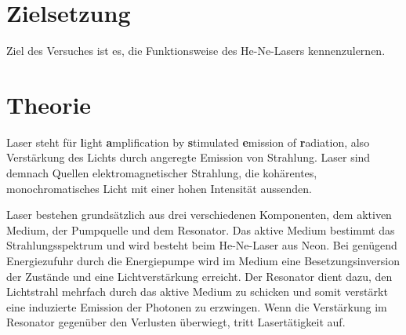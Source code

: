 \section{Zielsetzung}
\label{sec:Zielsetzung}
Ziel des Versuches ist es, die Funktionsweise des He-Ne-Lasers kennenzulernen.

\section{Theorie}
\label{sec:Theorie}

Laser steht für \textbf{l}ight \textbf{a}mplification by \textbf{s}timulated \textbf{e}mission of \textbf{r}adiation, also
Verstärkung des Lichts durch angeregte Emission von Strahlung.
Laser sind demnach Quellen elektromagnetischer Strahlung, die kohärentes, monochromatisches Licht mit einer hohen Intensität aussenden.

Laser bestehen grundsätzlich aus drei verschiedenen Komponenten, dem aktiven Medium, der Pumpquelle und dem Resonator.
Das aktive Medium bestimmt das Strahlungsspektrum und wird besteht beim He-Ne-Laser aus Neon.
Bei genügend Energiezufuhr durch die Energiepumpe wird im Medium eine Besetzungsinversion der Zustände und eine Lichtverstärkung erreicht.
Der Resonator dient dazu, den Lichtstrahl mehrfach durch das aktive Medium zu schicken und somit verstärkt eine induzierte Emission der Photonen
zu erzwingen.
Wenn die Verstärkung im Resonator gegenüber den Verlusten überwiegt, tritt Lasertätigkeit auf.

